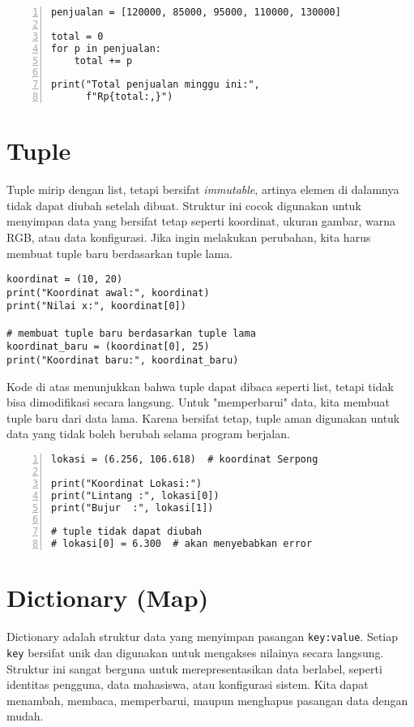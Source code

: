     \begin{lstlisting}[style=PythonStyle, numbers=left, firstnumber=1]
penjualan = [120000, 85000, 95000, 110000, 130000]

total = 0
for p in penjualan:
    total += p

print("Total penjualan minggu ini:",
      f"Rp{total:,}")
    \end{lstlisting}

\section{Tuple}
Tuple mirip dengan list, tetapi bersifat \textit{immutable}, artinya elemen di dalamnya tidak dapat diubah setelah dibuat. 
Struktur ini cocok digunakan untuk menyimpan data yang bersifat tetap seperti koordinat, ukuran gambar, warna RGB, atau data konfigurasi. 
Jika ingin melakukan perubahan, kita harus membuat tuple baru berdasarkan tuple lama.

\begin{lstlisting}[style=PythonStyle]
koordinat = (10, 20)
print("Koordinat awal:", koordinat)
print("Nilai x:", koordinat[0])

# membuat tuple baru berdasarkan tuple lama
koordinat_baru = (koordinat[0], 25)
print("Koordinat baru:", koordinat_baru)
\end{lstlisting}

Kode di atas menunjukkan bahwa tuple dapat dibaca seperti list, 
tetapi tidak bisa dimodifikasi secara langsung. 
Untuk "memperbarui" data, kita membuat tuple baru dari data lama. 
Karena bersifat tetap, tuple aman digunakan untuk data yang tidak boleh berubah selama program berjalan.

    \begin{lstlisting}[style=PythonStyle, numbers=left, firstnumber=1]
lokasi = (6.256, 106.618)  # koordinat Serpong

print("Koordinat Lokasi:")
print("Lintang :", lokasi[0])
print("Bujur  :", lokasi[1])

# tuple tidak dapat diubah
# lokasi[0] = 6.300  # akan menyebabkan error
    \end{lstlisting}

\section{Dictionary (Map)}
Dictionary adalah struktur data yang menyimpan pasangan \texttt{key:value}. 
Setiap \texttt{key} bersifat unik dan digunakan untuk mengakses nilainya secara langsung. 
Struktur ini sangat berguna untuk merepresentasikan data berlabel, seperti identitas pengguna, data mahasiswa, atau konfigurasi sistem. 
Kita dapat menambah, membaca, memperbarui, maupun menghapus pasangan data dengan mudah.

